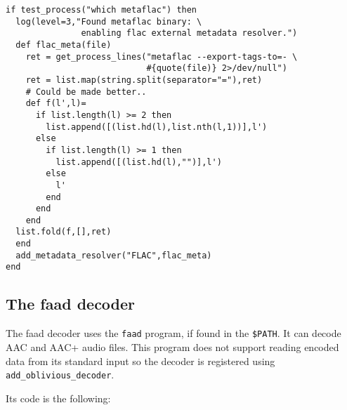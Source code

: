 \begin{verbatim}
if test_process("which metaflac") then
  log(level=3,"Found metaflac binary: \
               enabling flac external metadata resolver.")
  def flac_meta(file)
    ret = get_process_lines("metaflac --export-tags-to=- \
                            #{quote(file)} 2>/dev/null")
    ret = list.map(string.split(separator="="),ret)
    # Could be made better..
    def f(l',l)=
      if list.length(l) >= 2 then
        list.append([(list.hd(l),list.nth(l,1))],l')
      else
        if list.length(l) >= 1 then
          list.append([(list.hd(l),"")],l')
        else
          l'
        end
      end
    end
  list.fold(f,[],ret)
  end
  add_metadata_resolver("FLAC",flac_meta)
end
\end{verbatim}
\subsection{The faad decoder}
The faad decoder uses the \verb+faad+ program, if found in the \verb+$PATH+. 
It can decode AAC and AAC+ audio files. This program does not support
reading encoded data from its standard input so the decoder is 
registered using \verb+add_oblivious_decoder+.

Its code is the following:

